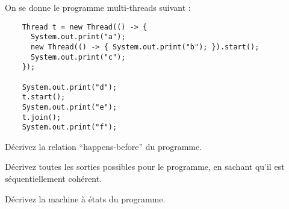 
\begingroup

\begin{exercice}[Asynchronie]
  \label{exo:introduction/asynchronous}

  On se donne le programme multi-threads suivant : 

  \begin{lstlisting}
    Thread t = new Thread(() -> {
      System.out.print("a");
      new Thread(() -> { System.out.print("b"); }).start();
      System.out.print("c");
    });

    System.out.print("d");
    t.start();
    System.out.print("e");
    t.join();
    System.out.print("f");
  \end{lstlisting}

  \begin{question}
  \item Décrivez la relation ``happens-before'' du programme.
  \item Décrivez toutes les sorties possibles pour le programme, en sachant qu'il est séquentiellement cohérent.
  \item Décrivez la machine à états du programme.
  \end{question}

\end{exercice}

\endgroup
\endinput
